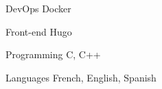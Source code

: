 

\begin{cvskills}

  \cvskill
    {DevOps} %
    {Docker} %


  \cvskill
    {Front-end} %
    {Hugo} %

  \cvskill
    {Programming} %
    {C, C++} %

  \cvskill
    {Languages} %
    {French, English, Spanish} %

\end{cvskills}
